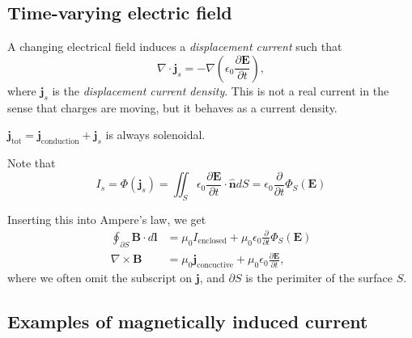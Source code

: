 \documentclass[a4paper, 12pt]{article}
\renewcommand{\vec}[1]{\bm{#1}}
\newcommand{\E}{\ensuremath{\vec{E}}}
\newcommand{\e}{\ensuremath{\epsilon_0}}
\renewcommand{\j}{\ensuremath{\vec{j}}}
\newcommand{\B}{\ensuremath{\vec{B}}}
\let\tmp\hat
\renewcommand{\hat}[1]{\vec{\tmp{#1}}}
\begin{document}
    \subsection{Time-varying electric field} \label{Time-varying electric field}
        A changing electrical field induces a \textit{displacement current} such that
        \begin{equation}
            \nabla \cdot \j_s = -\nabla\left(\e\frac{\partial\E}{\partial t}\right),
        \end{equation}
        where $\j_s$ is the \textit{displacement current density}. This is not a real current in the sense that charges are moving, 
        but it behaves as a current density.

        $\j_{\text{tot}} = \j_{\text{conduction}} + \j_s$ is always solenoidal. 

        Note that 
        \begin{equation*}
            I_s = \Phi(\j_s) = \iint_S \e\frac{\partial\E}{\partial t}\cdot\hat{n}dS = \e\frac{\partial}{\partial t}\Phi_S(\E)
        \end{equation*}

        Inserting this into Ampere's law, we get 
        \begin{align}
            \oint_{\partial S}\B\cdot d\vec{l} &= \mu_0 I_{\text{enclosed}} + \mu_0\e\frac{\partial}{\partial t}\Phi_S\left(\E\right)\\
            \nabla\times\B &= \mu_0\j_{\text{concuctive}} + \mu_0\e\frac{\partial\E}{\partial t},
        \end{align}
        where we often omit the subscript on $\j$, and $\partial S$ is the perimiter of the surface $S$.
    
    \subsection{Examples of magnetically induced current}
\end{document}
